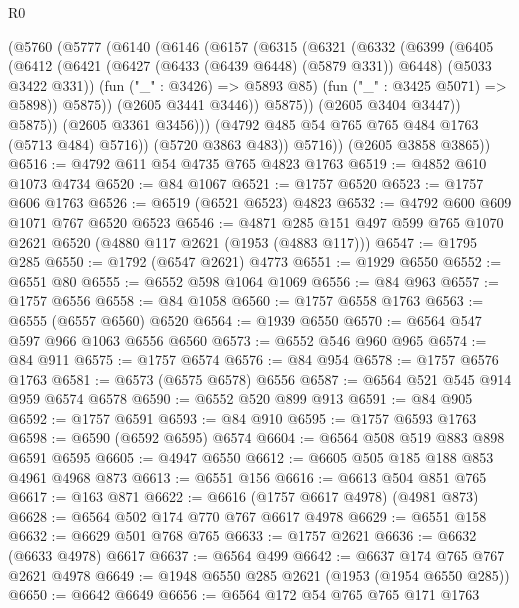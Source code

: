 \begin{lexlean}{R0}
\begin{coremodule}
              (@5760
                (@5777
                  (@6140
                    (@6146
                      (@6157
                        (@6315
                          (@6321
                            (@6332
                              (@6399
                                (@6405
                                  (@6412
                                    (@6421
                                      (@6427 (@6433 (@6439 @6448) (@5879 @331)) @6448)
                                      (@5033 @3422 @331))
                                    (fun ("_" : @3426) => @5893 @85)
                                    (fun ("_" : @3425 @5071) => @5898))
                                  @5875))
                              (@2605 @3441 @3446))
                            @5875))
                        (@2605 @3404 @3447))
                      @5875))
                  (@2605 @3361 @3456)))
              (@4792 @485 @54 @765 @765 @484 @1763 (@5713 @484) @5716))
            (@5720 @3863 @483))
          @5716))
      (@2605 @3858 @3865))
@6516 := @4792 @611 @54 @4735 @765 @4823 @1763
@6519 := @4852 @610 @1073 @4734
@6520 := @84 @1067
@6521 := @1757 @6520
@6523 := @1757 @606 @1763
@6526 := @6519 (@6521 @6523) @4823
@6532 := @4792 @600 @609 @1071 @767 @6520 @6523
@6546 := @4871 @285 @151 @497 @599 @765 @1070 @2621 @6520 (@4880 @117 @2621 (@1953 (@4883 @117)))
@6547 := @1795 @285
@6550 := @1792 (@6547 @2621) @4773
@6551 := @1929 @6550
@6552 := @6551 @80
@6555 := @6552 @598 @1064 @1069
@6556 := @84 @963
@6557 := @1757 @6556
@6558 := @84 @1058
@6560 := @1757 @6558 @1763
@6563 := @6555 (@6557 @6560) @6520
@6564 := @1939 @6550
@6570 := @6564 @547 @597 @966 @1063 @6556 @6560
@6573 := @6552 @546 @960 @965
@6574 := @84 @911
@6575 := @1757 @6574
@6576 := @84 @954
@6578 := @1757 @6576 @1763
@6581 := @6573 (@6575 @6578) @6556
@6587 := @6564 @521 @545 @914 @959 @6574 @6578
@6590 := @6552 @520 @899 @913
@6591 := @84 @905
@6592 := @1757 @6591
@6593 := @84 @910
@6595 := @1757 @6593 @1763
@6598 := @6590 (@6592 @6595) @6574
@6604 := @6564 @508 @519 @883 @898 @6591 @6595
@6605 := @4947 @6550
@6612 := @6605 @505 @185 @188 @853 @4961 @4968 @873
@6613 := @6551 @156
@6616 := @6613 @504 @851 @765
@6617 := @163 @871
@6622 := @6616 (@1757 @6617 @4978) (@4981 @873)
@6628 := @6564 @502 @174 @770 @767 @6617 @4978
@6629 := @6551 @158
@6632 := @6629 @501 @768 @765
@6633 := @1757 @2621
@6636 := @6632 (@6633 @4978) @6617
@6637 := @6564 @499
@6642 := @6637 @174 @765 @767 @2621 @4978
@6649 := @1948 @6550 @285 @2621 (@1953 (@1954 @6550 @285))
@6650 := @6642 @6649
@6656 := @6564 @172 @54 @765 @765 @171 @1763

\end{coremodule}
\end{lexlean}
